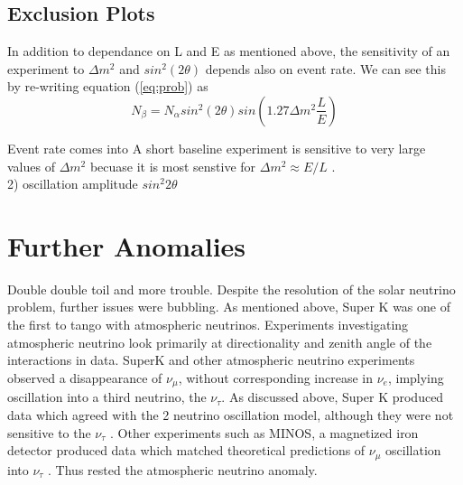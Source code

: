 \documentclass[12pt]{article}
\begin{document}
\subsection{Exclusion Plots}
In addition to dependance on L and E as mentioned above, the sensitivity of an experiment to $\Delta m^2$ and $sin^2(2\theta)$ depends also on event rate. We can see this by re-writing equation (\ref{eq:prob}) as
\begin{equation} \label{eq:probN}
N_\beta = N_\alpha sin^2(2\theta)sin(1.27\Delta m^2  \frac{L}{E})
\end{equation}


Event rate comes into A short baseline experiment is sensitive to very large values of $\Delta m^2$ becuase it is most senstive for $\Delta m^2 \approx E/L$ \cite{warwick}.  
\\ 2) oscillation amplitude $sin^2 2\theta$

\section{Further Anomalies}
Double double toil and more trouble. Despite the resolution of the solar neutrino problem, further issues were bubbling. As mentioned above, Super K was one of the first to tango with atmospheric neutrinos.  Experiments investigating atmospheric neutrino look primarily at directionality and zenith angle of the interactions in data. SuperK and other atmospheric neutrino experiments observed a disappearance of $\nu_\mu$, without corresponding increase in $\nu_e$, implying oscillation into a third neutrino, the $\nu_\tau$. As discussed above, Super K produced data which agreed with the 2 neutrino oscillation model, although they were not sensitive to the $\nu_\tau$ \cite{superk}. Other experiments such as MINOS, a magnetized iron detector produced data which matched theoretical predictions of $\nu_\mu$ oscillation into $\nu_\tau$ \cite{minos}. Thus rested the atmospheric neutrino anomaly.
\end{document}
